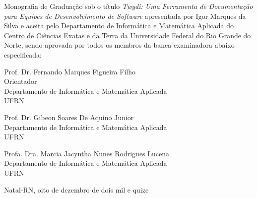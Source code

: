 \begin{folhadeaprovacao}
	\setlength{\ABNTsignthickness}{0.4pt}
	\setlength{\ABNTsignwidth}{10cm}

	\noindent
	Monografia de Graduação sob o título \textit{Twydi: Uma Ferramenta de Documentação para Equipes de Desenvolvimento de Software} apresentada por
	Igor Marques da Silva e aceita pelo Departamento de Informática e Matemática Aplicada do
	Centro de Ciências Exatas e da Terra da Universidade Federal do Rio Grande do Norte,
	sendo aprovada por todos os membros da banca examinadora abaixo especificada:

	\assinatura
	{
		Prof. Dr. Fernando Marques Figueira Filho\\
		{\small Orientador} 															\\
		{\footnotesize
			Departamento de Informática e Matemática Aplicada 																	\\
		  	UFRN
		}
	}

	\assinatura
	{
		Prof. Dr. Gibeon Soares De Aquino Junior						 \\
		{\footnotesize
			Departamento de Informática e Matemática Aplicada 																	\\
		  	UFRN
		}
	}

	\assinatura
	{
		Profa. Dra. Marcia Jacyntha Nunes Rodrigues Lucena						 \\
		{\footnotesize
			Departamento de Informática e Matemática Aplicada 																	\\
		  	UFRN
		}
	}

	\vfill

	\begin{center}
		Natal-RN, oito de dezembro de dois mil e quize
	\end{center}
\end{folhadeaprovacao}
